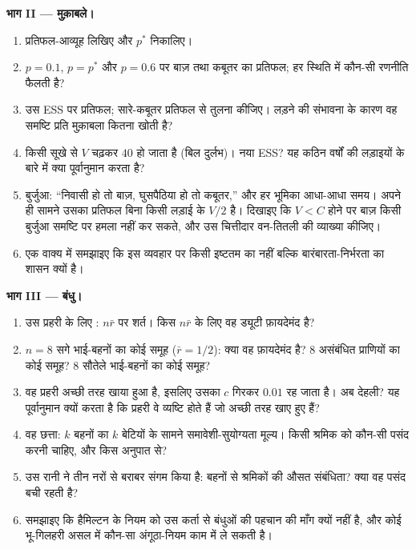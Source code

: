 \begin{problem}
\medskip
\noindent\textbf{भाग II --- मुक़ाबले।}
\begin{enumerate}[resume]
  \item प्रतिफल-आव्यूह लिखिए और $p^{*}$ निकालिए।
  \item $p = 0.1$, $p = p^{*}$ और $p =
        0.6$ पर बाज़ तथा कबूतर का प्रतिफल; हर स्थिति में कौन-सी रणनीति
        फैलती है?
  \item उस ESS पर प्रतिफल; सारे-कबूतर प्रतिफल से तुलना कीजिए। लड़ने की
        संभावना के कारण वह समष्टि प्रति मुक़ाबला कितना खोती है?
  \item किसी सूखे से $V$ चढ़कर $40$ हो जाता है (बिल दुर्लभ)। नया ESS?
        यह कठिन वर्षों की लड़ाइयों के बारे में क्या पूर्वानुमान करता है?
  \item बुर्जुआ: ``निवासी हो तो बाज़, घुसपैठिया हो तो कबूतर,'' और हर
        भूमिका आधा-आधा समय। अपने ही सामने उसका प्रतिफल बिना किसी लड़ाई
        के $V/2$ है। दिखाइए कि $V
        < C$ होने पर बाज़ किसी बुर्जुआ समष्टि पर हमला नहीं कर सकते, और
        उस चित्तीदार वन-तितली की व्याख्या कीजिए।
  \item एक वाक्य में समझाइए कि इस व्यवहार पर किसी इष्टतम का नहीं बल्कि
        बारंबारता-निर्भरता का शासन क्यों है।
\end{enumerate}

\medskip
\noindent\textbf{भाग III --- बंधु।}
\begin{enumerate}[resume]
  \item उस प्रहरी के लिए : $n\bar r$ पर शर्त। किस
        $n\bar r$ के लिए वह ड्यूटी फ़ायदेमंद है?
  \item $n = 8$ सगे भाई-बहनों का कोई समूह ($\bar r = 1/2$): क्या वह
        फ़ायदेमंद है? 8 असंबंधित प्राणियों का कोई समूह? 8 सौतेले
        भाई-बहनों का कोई समूह?
  \item वह प्रहरी अच्छी तरह खाया हुआ है, इसलिए उसका $c$ गिरकर
        $0.01$ रह जाता है। अब देहली? यह पूर्वानुमान क्यों करता है कि
        प्रहरी वे व्यष्टि होते हैं जो अच्छी तरह खाए हुए हैं?
  \item वह छत्ता: $k$ बहनों का $k$ बेटियों के सामने समावेशी-सुयोग्यता
        मूल्य। किसी श्रमिक को कौन-सी पसंद करनी चाहिए, और किस अनुपात से?
  \item उस रानी ने तीन नरों से बराबर संगम किया है: बहनों से श्रमिकों की
        औसत संबंधिता? क्या वह पसंद बची रहती है?
  \item समझाइए कि हैमिल्टन के नियम को उस कर्ता से बंधुओं की पहचान की
        माँग क्यों नहीं है, और कोई भू-गिलहरी असल में कौन-सा अंगूठा-नियम
        काम में ले सकती है।
\end{enumerate}


\end{problem}
